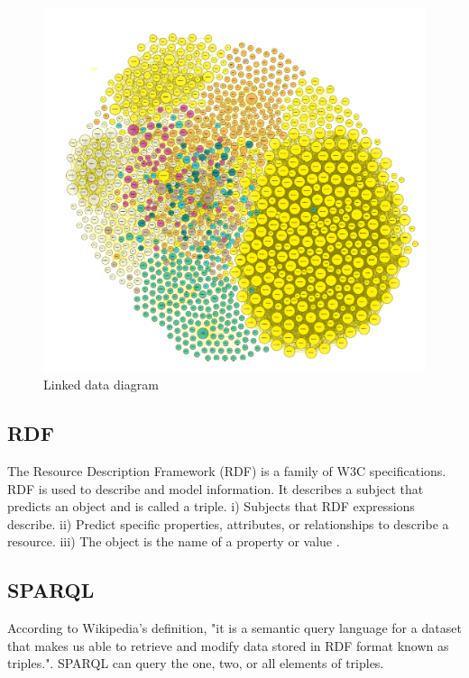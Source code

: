 \begin{center}
	\begin{figure}[htb!]
		
		\begin{minipage}{0.55\linewidth}
			\centering
			\includegraphics[width=1.55\textwidth]{images/chap02_LinkData.png}
		\end{minipage}
		\caption[Linked data diagram]{Linked data diagram \cite{Hector}}
		
		
	\end{figure}
	
\end{center}
\subsection{RDF}
The Resource Description Framework (RDF) is a family of W3C specifications. RDF is used to describe and model information. It describes a subject that predicts an object and is called a triple.
i) Subjects that RDF expressions describe.
ii) Predict specific properties, attributes, or relationships to describe a resource.
iii) The object is the name of a property or value \cite{Hector}.
\subsection{SPARQL}
According to Wikipedia's definition, "it is a semantic query language for a dataset that makes us able to retrieve and modify data stored in RDF format known as triples.". SPARQL can query the one, two, or all elements of triples.

